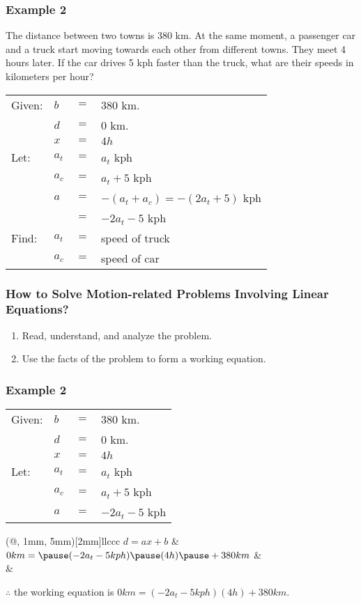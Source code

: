 \documentclass[14pt]{beamer}
\begin{document}
\begin{frame}
	\frametitle{Example 2}
	\footnotesize The distance between two towns is 380 km. At the same moment, a passenger car and a truck start moving towards each other from different towns. They meet 4	hours later. If the car drives 5 kph faster than the truck, what are their speeds in kilometers per hour?
	
	\vone
	\normalsize
	\begin{tabular}{llll}
		Given: & \pause $ b $ & $ = $ & 380 km. \\
		& \pause $ d $ & $ = $ & 0 km. \\
		& \pause $ x $ & $ = $ & $ 4h $ \\
		\pause Let: & \pause $ a_t $ & $ = $ & $ a_t $ kph \\
		& \pause $ a_c $ & $ = $ & $ a_t + 5 $ kph \\
		& \pause $ a $ & $ = $ & $ -(a_t + a_c) = -(2a_t + 5) $ kph \\
		&  & $ = $ & $-2a_t - 5 $ kph \\
		\pause Find: & \pause $ a_t $ & $ = $ & speed of truck \\
		   & \pause $ a_c $ & $ = $ & speed of car \\
	\end{tabular}
\end{frame}  

\begin{frame}
	\frametitle{How  to Solve Motion-related Problems Involving Linear Equations?}
	
	\begin{enumerate}  
		\item Read, understand, and analyze the problem. 
		\item Use the facts of the problem to form a working equation.
	\end{enumerate}  
\end{frame}

\begin{frame}
	\frametitle{Example 2}
	\begin{tabular}{llll}
		Given: &  $ b $ & $ = $ & 380 km. \\
		&  $ d $ & $ = $ & 0 km. \\
		&  $ x $ & $ = $ & $ 4h $ \\
		 Let: &  $ a_t $ & $ = $ & $ a_t $ kph \\
		&  $ a_c $ & $ = $ & $ a_t + 5 $ kph \\
		&  $ a $ & $ = $ & $-2a_t - 5 $ kph \\
	\end{tabular}
	
	\begin{TAB}(@, 1mm, 5mm)[2mm]{ll}{ccc}
		\pause $ d = ax + b $ &  \\
		
		\pause $ 0 km = \pause (-2a_t - 5  kph) \pause (4 h) \pause + 380 km $  & \\
		& \\
	\end{TAB}
	
	\pause $ \therefore $ the working equation is $ 0 km = (-2a_t - 5  kph) (4 h) + 380 km $.
\end{frame}  
\end{document}
